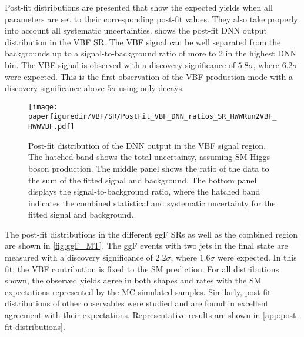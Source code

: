 Post-fit distributions are presented that show the expected yields when all parameters are set to their corresponding post-fit values. They also take properly into account all systematic uncertainties.  shows the post-fit DNN output distribution in the VBF SR.
The VBF signal can be well separated from the backgrounds up to a signal-to-background ratio of more to 2 in the highest DNN bin. 
The VBF signal is observed with a discovery significance of $5.8\sigma$, where $6.2\sigma$ were expected.
This is the first observation of the VBF production mode with a discovery significance above $5\sigma$ using only \HWW decays.
\begin{figure}[htb]
  \centering
  \texttt{[image: \\paperfiguredir/VBF/SR/PostFit\_VBF\_DNN\_ratios\_SR\_HWWRun2VBF\_HWWVBF.pdf]}
  \caption{
    Post-fit distribution of the DNN output in the VBF signal region.
    The hatched band shows the total uncertainty, assuming SM Higgs boson production.
    The middle panel shows the ratio of the data to the sum of the fitted signal and background.
    The bottom panel displays the signal-to-background ratio, where the hatched band indicates the combined statistical and systematic uncertainty for the fitted signal and background.
  }
  \label{fig:VBF_DNN}
  \end{figure}
The post-fit \mT distributions in the different ggF SRs as well as the combined region are shown in \cref{fig:ggF_MT}.
The ggF events with two jets in the final state are measured with a discovery significance of $2.2\sigma$, where $1.6\sigma$ were expected. In this fit, the VBF contribution is fixed to the SM prediction.
For all distributions shown, the observed yields agree in both shapes and rates with the SM expectations represented by the MC simulated samples. 
Similarly, post-fit distributions of other observables were studied and are found in excellent agreement with their expectations. Representative results are shown in \cref{app:post-fit-distributions}. 

